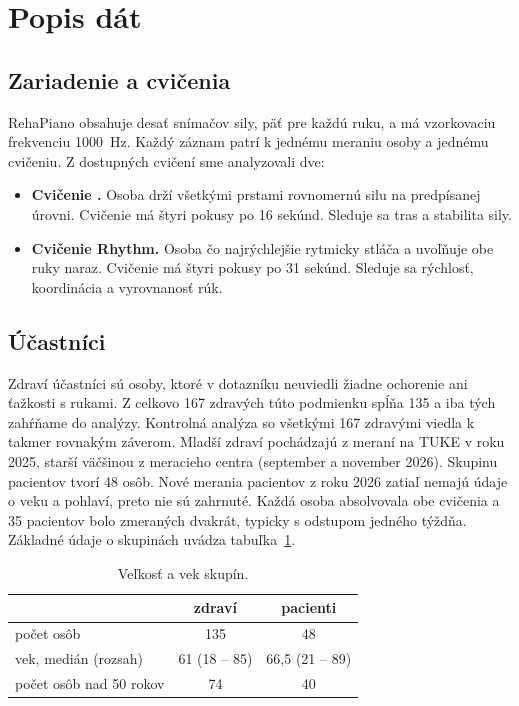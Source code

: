 \documentclass[12pt,a4paper]{article}
\begin{document}
\section{Popis dát}
\label{sec:data}

\subsection{Zariadenie a cvičenia}

RehaPiano obsahuje desať snímačov sily, päť pre každú ruku, a má vzorkovaciu frekvenciu 1000~Hz. Každý záznam
patrí k jednému meraniu osoby a jednému cvičeniu. Z dostupných cvičení sme analyzovali dve:
\begin{itemize}
  \item \textbf{Cvičenie \ef{}.} Osoba drží všetkými prstami rovnomernú silu na predpísanej úrovni. Cvičenie má štyri pokusy
        po 16 sekúnd. Sleduje sa tras a stabilita sily.
  \item \textbf{Cvičenie Rhythm.} Osoba čo najrýchlejšie rytmicky stláča a uvoľňuje obe ruky naraz. Cvičenie má štyri
        pokusy po 31 sekúnd. Sleduje sa rýchlosť, koordinácia a vyrovnanosť rúk.
\end{itemize}

\subsection{Účastníci}

Zdraví účastníci sú osoby, ktoré v dotazníku neuviedli žiadne ochorenie ani ťažkosti s rukami. Z celkovo
167 zdravých túto podmienku spĺňa 135 a iba tých zahŕňame do analýzy. Kontrolná analýza so všetkými
167 zdravými viedla k takmer rovnakým záverom. Mladší zdraví pochádzajú z meraní na TUKE v roku 2025, starší
väčšinou z meracieho centra (september a november 2026). Skupinu pacientov tvorí 48 osôb. Nové merania pacientov
z roku 2026 zatiaľ nemajú údaje o veku a pohlaví, preto nie sú zahrnuté. Každá osoba absolvovala obe cvičenia
a 35 pacientov bolo zmeraných dvakrát, typicky s odstupom jedného týždňa. Základné údaje o skupinách uvádza
tabuľka~\ref{tab:skupiny}.

\begin{table}[H]
\centering
\caption{Veľkosť a vek skupín.}
\label{tab:skupiny}
\begin{tabular}{lcc}
\toprule
 & zdraví & pacienti \\
\midrule
počet osôb & 135 & 48 \\
vek, medián (rozsah) & 61 (18 -- 85) & 66,5 (21 -- 89) \\
počet osôb nad 50 rokov & 74 & 40 \\
\bottomrule
\end{tabular}
\end{table}
\end{document}
